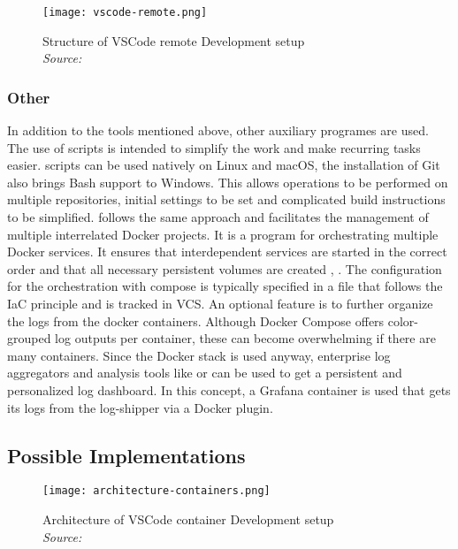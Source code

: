 \documentclass[12pt, a4paper]{article}
\begin{document}
        \begin{figure}[]
            \centering
            \texttt{[image: vscode-remote.png]}
            \caption{Structure of \ac{VSCode} remote Development setup \\\textit{Source:~\cite{vscodedevcontainer}}}\label{fig::vscoderemote}
        \end{figure}

        \subsubsection{Other}
        In addition to the tools mentioned above, other auxiliary programes are used. The use of scripts is intended to simplify the work and make recurring tasks easier.  scripts can be used natively on Linux and macOS, the installation of Git also brings Bash support to Windows. This allows operations to be performed on multiple repositories, initial settings to be set and complicated build instructions to be simplified.  follows the same approach and facilitates the management of multiple interrelated Docker projects. It is a program for orchestrating multiple Docker services. It ensures that interdependent services are started in the correct order and that all necessary persistent volumes are created \cite{docker2020}, \cite{dockerdocs}. The configuration for the orchestration with compose is typically specified in a  file that follows the \ac{IaC} principle and is tracked in \ac{VCS}. An optional feature is to further organize the logs from the docker containers. Although Docker Compose offers color-grouped log outputs per container, these can become overwhelming if there are many containers. Since the Docker stack is used anyway, enterprise log aggregators and analysis tools like  or  can be used to get a persistent and personalized log dashboard. In this concept, a Grafana container is used that gets its logs from the  log-shipper via a Docker plugin.

    \subsection{Possible Implementations}
    \begin{figure}[]
        \centering
        \texttt{[image: architecture-containers.png]}
        \caption{Architecture of \ac{VSCode} container Development setup \\\textit{Source:~\cite{vscodedevcontainer}}}\label{fig::vscodecontainer}
    \end{figure}
\end{document}
